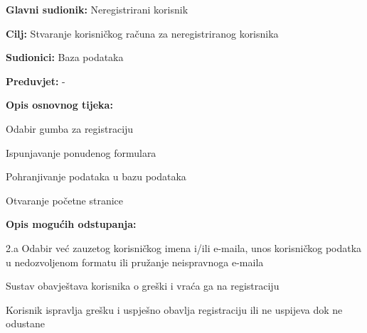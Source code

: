 \documentclass{article}
\begin{document}
		\begin{packed_item}
			
			\item \textbf{Glavni sudionik: }Neregistrirani korisnik
			\item  \textbf{Cilj:} Stvaranje korisničkog računa za neregistriranog korisnika
			\item  \textbf{Sudionici:} Baza podataka
			\item  \textbf{Preduvjet:} -
			\item  \textbf{Opis osnovnog tijeka:}
			
			\item[] \begin{packed_enum}
				\item Odabir gumba za registraciju
				\item Ispunjavanje ponudenog formulara
				\item Pohranjivanje podataka u bazu podataka
				\item Otvaranje početne stranice 
			\end{packed_enum}
			
			\item  \textbf{Opis mogućih odstupanja:}
			
			\item[] \begin{packed_item}
				
				\item[2.a] Odabir već zauzetog korisničkog imena i/ili e-maila, unos korisničkog podatka u nedozvoljenom formatu ili pružanje neispravnoga e-maila
				\item[] \begin{packed_enum}
					\item Sustav obavještava korisnika o greški i vraća ga na registraciju 
					\item Korisnik ispravlja grešku i uspješno obavlja registraciju ili ne uspijeva dok ne odustane
				\end{packed_enum}
			\end{packed_item}
		\end{packed_item}
	
\end{document}
